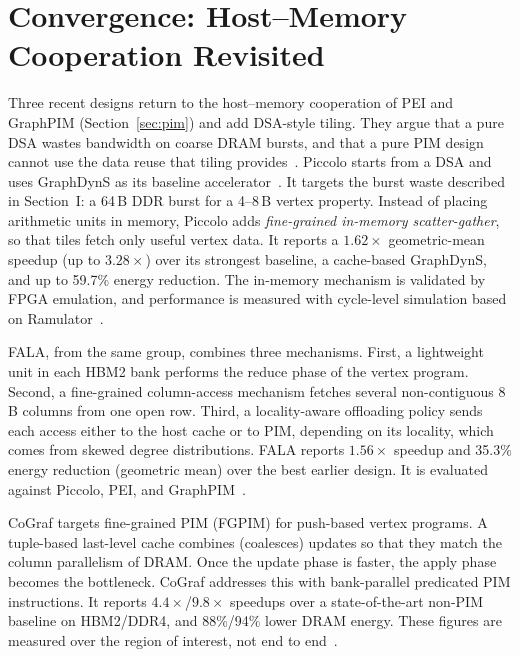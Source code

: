 \documentclass[journal,onecolumn]{IEEEtran}
\begin{document}
\section{Convergence: Host--Memory Cooperation Revisited}\label{sec:hybrid}
Three recent designs return to the host--memory cooperation of PEI and GraphPIM (Section~\ref{sec:pim}) and add DSA-style tiling. They argue that a pure DSA wastes bandwidth on coarse DRAM bursts, and that a pure PIM design cannot use the data reuse that tiling provides~\cite{shin2025piccolo,shin2025fala}. Piccolo starts from a DSA and uses GraphDynS as its baseline accelerator~\cite{shin2025piccolo}. It targets the burst waste described in Section~I: a 64\,B DDR burst for a 4--8\,B vertex property. Instead of placing arithmetic units in memory, Piccolo adds \emph{fine-grained in-memory scatter-gather}, so that tiles fetch only useful vertex data. It reports a $1.62\times$ geometric-mean speedup (up to $3.28\times$) over its strongest baseline, a cache-based GraphDynS, and up to 59.7\% energy reduction. The in-memory mechanism is validated by FPGA emulation, and performance is measured with cycle-level simulation based on Ramulator~\cite{shin2025piccolo}.

FALA, from the same group, combines three mechanisms. First, a lightweight unit in each HBM2 bank performs the reduce phase of the vertex program. Second, a fine-grained column-access mechanism fetches several non-contiguous 8\,B columns from one open row. Third, a locality-aware offloading policy sends each access either to the host cache or to PIM, depending on its locality, which comes from skewed degree distributions. FALA reports $1.56\times$ speedup and 35.3\% energy reduction (geometric mean) over the best earlier design. It is evaluated against Piccolo, PEI, and GraphPIM~\cite{shin2025fala}.

CoGraf targets fine-grained PIM (FGPIM) for push-based vertex programs. A tuple-based last-level cache combines (coalesces) updates so that they match the column parallelism of DRAM. Once the update phase is faster, the apply phase becomes the bottleneck. CoGraf addresses this with bank-parallel predicated PIM instructions. It reports $4.4\times$/$9.8\times$ speedups over a state-of-the-art non-PIM baseline on HBM2/DDR4, and 88\%/94\% lower DRAM energy. These figures are measured over the region of interest, not end to end~\cite{yenimol2026cograf}.
\end{document}
